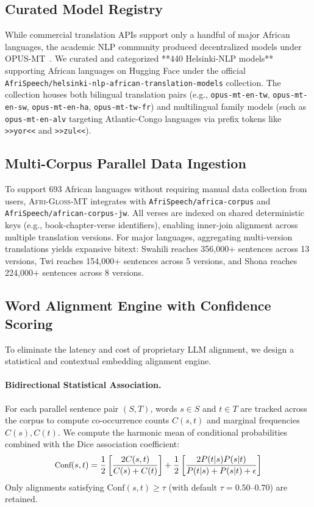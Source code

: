 \documentclass[10pt,twocolumn]{article}
\newcommand{\agm}{\textsc{Afri-Gloss-MT}}
\begin{document}
\subsection{Curated Model Registry}
While commercial translation APIs support only a handful of major African languages, the academic NLP community produced decentralized models under OPUS-MT~\cite{tiedemann2020opus}. We curated and categorized **440 Helsinki-NLP models** supporting African languages on Hugging Face under the official \texttt{AfriSpeech/helsinki-nlp-african-translation-models} collection. The collection houses both bilingual translation pairs (e.g., \texttt{opus-mt-en-tw}, \texttt{opus-mt-en-sw}, \texttt{opus-mt-en-ha}, \texttt{opus-mt-tw-fr}) and multilingual family models (such as \texttt{opus-mt-en-alv} targeting Atlantic-Congo languages via prefix tokens like \texttt{>>yor<<} and \texttt{>>zul<<}).

\subsection{Multi-Corpus Parallel Data Ingestion}
To support 693 African languages without requiring manual data collection from users, \agm{} integrates with \texttt{AfriSpeech/africa-corpus} and \texttt{AfriSpeech/african-corpus-jw}. All verses are indexed on shared deterministic keys (e.g., book-chapter-verse identifiers), enabling inner-join alignment across multiple translation versions. For major languages, aggregating multi-version translations yields expansive bitext: Swahili reaches 356,000+ sentences across 13 versions, Twi reaches 154,000+ sentences across 5 versions, and Shona reaches 224,000+ sentences across 8 versions.

\subsection{Word Alignment Engine with Confidence Scoring}
To eliminate the latency and cost of proprietary LLM alignment, we design a statistical and contextual embedding alignment engine.
\paragraph{Bidirectional Statistical Association.} For each parallel sentence pair $(S, T)$, words $s \in S$ and $t \in T$ are tracked across the corpus to compute co-occurrence counts $C(s, t)$ and marginal frequencies $C(s), C(t)$. We compute the harmonic mean of conditional probabilities combined with the Dice association coefficient:
\begin{equation}
\small
\text{Conf}(s, t) = \frac{1}{2}\left[\frac{2 C(s, t)}{C(s) + C(t)}\right] + \frac{1}{2}\left[\frac{2 P(t|s) P(s|t)}{P(t|s) + P(s|t) + \epsilon}\right]
\end{equation}
Only alignments satisfying $\text{Conf}(s, t) \ge \tau$ (with default $\tau = 0.50$--$0.70$) are retained.
\end{document}
